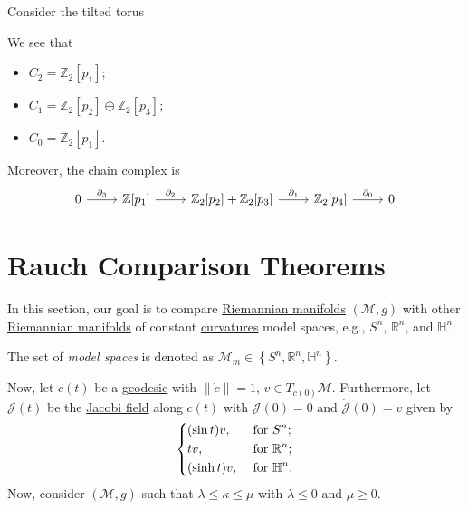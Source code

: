 \begin{eg}
	Consider the tilted torus
	\begin{center}
	\end{center}
	We see that
	\begin{itemize}
		\item \(C_2 = \mathbb{Z} _2 [p_1]\);
		\item \(C_1 = \mathbb{Z} _2[p_2] \oplus \mathbb{Z} _2[p_3]\);
		\item \(C_0 = \mathbb{Z} _2[p_1]\).
	\end{itemize}
	Moreover, the chain complex is
	\[\begin{tikzcd}
			0 & {\mathbb{Z}[p_1]} & {\mathbb{Z}_2[p_2]+\mathbb{Z}_2[p_3]} & {\mathbb{Z}_2[p_4]} & 0
			\arrow["{\partial_3}", from=1-1, to=1-2]
			\arrow["{\partial_2}", from=1-2, to=1-3]
			\arrow["{\partial_1}", from=1-3, to=1-4]
			\arrow["{\partial_0}", from=1-4, to=1-5]
		\end{tikzcd}\]
\end{eg}

\section{Rauch Comparison Theorems}
In this section, our goal is to compare \hyperref[def:Riemannian-manifold]{Riemannian manifolds} \((\mathcal{M} , g)\) with other \hyperref[def:Riemannian-manifold]{Riemannian manifolds} of constant \hyperref[def:sectional-curvature]{curvatures} model spaces, e.g., \(S^n\), \(\mathbb{R} ^n\), and \(\mathbb{H} ^n\).

\begin{notation}
	The set of \emph{model spaces} is denoted as \(\mathcal{M} _m \in \left\{ S^n, \mathbb{R} ^n, \mathbb{H} ^n \right\} \).
\end{notation}

Now, let \(c(t)\) be a \hyperref[def:geodesic]{geodesic} with \(\lVert \dot{c} \rVert =1\), \(v\in T_{c(0)} \mathcal{M} \). Furthermore, let \(\mathcal{J} (t)\) be the \hyperref[def:Jacobi-field]{Jacobi field} along \(c(t)\) with \(\mathcal{J} (0) = 0\) and \(\dot{\mathcal{J} }(0) = v \) given by
\[
	\begin{dcases}
		(\sin t)v,  & \text{ for } S^n ;           \\
		tv,         & \text{ for } \mathbb{R} ^n ; \\
		(\sinh t)v, & \text{ for } \mathbb{H} ^n .
	\end{dcases}
\]
Now, consider \((\mathcal{M} , g)\) such that \(\lambda \leq \kappa \leq \mu \) with \(\lambda \leq 0\) and \(\mu \geq 0\).

